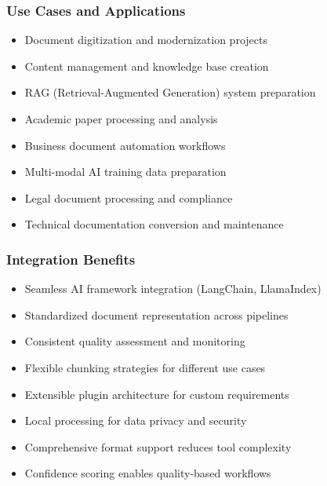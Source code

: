\begin{frame}[fragile]\frametitle{Use Cases and Applications}
      \begin{itemize}
	\item Document digitization and modernization projects
	\item Content management and knowledge base creation
	\item RAG (Retrieval-Augmented Generation) system preparation
	\item Academic paper processing and analysis
	\item Business document automation workflows
	\item Multi-modal AI training data preparation
	\item Legal document processing and compliance
	\item Technical documentation conversion and maintenance
	  \end{itemize}
\end{frame}

\begin{frame}[fragile]\frametitle{Integration Benefits}
      \begin{itemize}
	\item Seamless AI framework integration (LangChain, LlamaIndex)
	\item Standardized document representation across pipelines
	\item Consistent quality assessment and monitoring
	\item Flexible chunking strategies for different use cases
	\item Extensible plugin architecture for custom requirements
	\item Local processing for data privacy and security
	\item Comprehensive format support reduces tool complexity
	\item Confidence scoring enables quality-based workflows
	  \end{itemize}
\end{frame}
